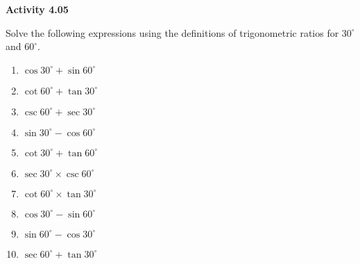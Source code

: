 \vspace{0.3ex}
\noindent\textbf{Activity 4.05}

\vspace{0.2ex}

Solve the following expressions using the definitions of trigonometric ratios for \( 30^\circ \) and \( 60^\circ \).
\begin{multicols}{2}
\begin{enumerate}
    \item \( \cos 30^\circ + \sin 60^\circ \)
    \item \( \cot 60^\circ + \tan 30^\circ \)
    \item \( \csc 60^\circ + \sec 30^\circ \)
    \item \( \sin 30^\circ - \cos 60^\circ \)
    \item \( \cot 30^\circ + \tan 60^\circ \)
    \item \( \sec 30^\circ \times \csc 60^\circ \)
    \item \( \cot 60^\circ \times \tan 30^\circ \)
    \item \( \cos 30^\circ - \sin 60^\circ \)
    \item \( \sin 60^\circ - \cos 30^\circ \)
    \item \( \sec 60^\circ + \tan 30^\circ \)
\end{enumerate}
\end{multicols}
